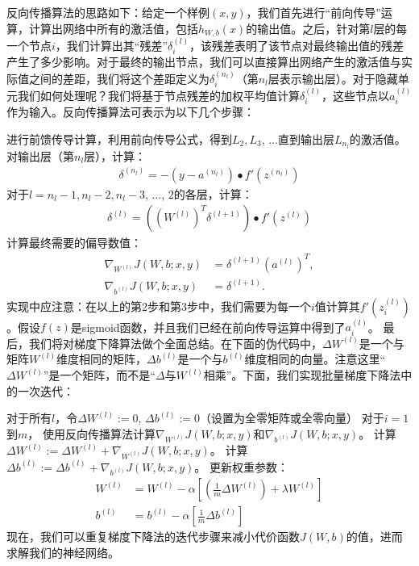 反向传播算法的思路如下：给定一个样例$(x,y)$，我们首先进行“前向传导”运算，计算出网络中所有的激活值，包括$h_{W,b}(x)$的输出值。之后，针对第$l$层的每一个节点$i$，我们计算出其“残差”$\delta^{(l)}_i$，该残差表明了该节点对最终输出值的残差产生了多少影响。对于最终的输出节点，我们可以直接算出网络产生的激活值与实际值之间的差距，我们将这个差距定义为$\delta^{(n_l)}_i$（第$n_l$层表示输出层）。对于隐藏单元我们如何处理呢？我们将基于节点残差的加权平均值计算$\delta^{(l)}_i$，这些节点以$a^{(l)}_i$作为输入。反向传播算法可表示为以下几个步骤：\par
进行前馈传导计算，利用前向传导公式，得到$L_2, L_3$, $\ldots$直到输出层$L_{n_l}$的激活值。
对输出层（第$n_l$层），计算：
\begin{align}
	\delta^{(n_l)}
	= - (y - a^{(n_l)}) \bullet f'(z^{(n_l)})
\end{align}
对于$l = n_l-1, n_l-2, n_l-3$, $\ldots$, $2$的各层，计算：
\begin{align}
	\delta^{(l)} = \left((W^{(l)})^T \delta^{(l+1)}\right) \bullet f'(z^{(l)})
\end{align}
计算最终需要的偏导数值：
\begin{align}
	\nabla_{W^{(l)}} J(W,b;x,y) &= \delta^{(l+1)} (a^{(l)})^T, \\
	\nabla_{b^{(l)}} J(W,b;x,y) &= \delta^{(l+1)}.
\end{align}
实现中应注意：在以上的第2步和第3步中，我们需要为每一个$i$值计算其$f'(z^{(l)}_i)$。假设$f(z)$是sigmoid函数，并且我们已经在前向传导运算中得到了$a^{(l)}_i$。
最后，我们将对梯度下降算法做个全面总结。在下面的伪代码中，$\Delta W^{(l)}$是一个与矩阵$W^{(l)}$维度相同的矩阵，$\Delta b^{(l)}$是一个与$b^{(l)}$维度相同的向量。注意这里“$\Delta W^{(l)}$”是一个矩阵，而不是“$ \Delta$与$W^{(l)}$相乘”。下面，我们实现批量梯度下降法中的一次迭代：\par

对于所有$l$，令$\Delta W^{(l)} := 0$, $\Delta b^{(l)} := 0 $（设置为全零矩阵或全零向量）
对于$i = 1$到$m$，
使用反向传播算法计算$\nabla_{W^{(l)}} J(W,b;x,y)$和$\nabla_{b^{(l)}} J(W,b;x,y)$。
计算$\Delta W^{(l)} := \Delta W^{(l)} + \nabla_{W^{(l)}} J(W,b;x,y)$。
计算$\Delta b^{(l)} := \Delta b^{(l)} + \nabla_{b^{(l)}} J(W,b;x,y)$。
更新权重参数：
\begin{align}
	W^{(l)} &= W^{(l)} - \alpha \left[ \left(\frac{1}{m} \Delta W^{(l)} \right) + \lambda W^{(l)}\right] \\
	b^{(l)} &= b^{(l)} - \alpha \left[\frac{1}{m} \Delta b^{(l)}\right]
\end{align}
现在，我们可以重复梯度下降法的迭代步骤来减小代价函数$J(W,b)$的值，进而求解我们的神经网络。

